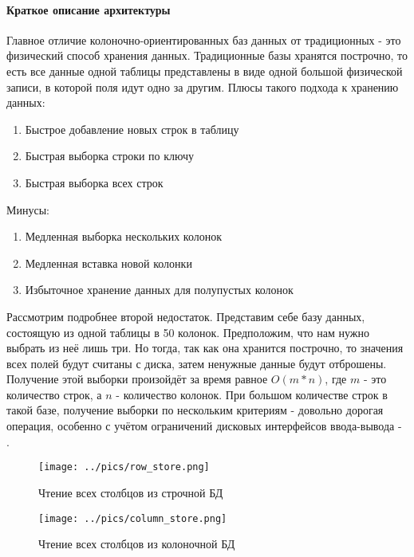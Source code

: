 \documentclass{matmex-diploma}
\begin{document}
        \paragraph{Краткое описание архитектуры}
            Главное отличие колоночно-ориентированных баз данных от традиционных - это физический способ хранения данных. Традиционные базы хранятся построчно, то есть все данные одной таблицы представлены в виде одной большой физической записи, в которой поля идут одно за другим.
        Плюсы такого подхода к хранению данных:
        \begin{enumerate}
            \item Быстрое добавление новых строк в таблицу
            \item Быстрая выборка строки по ключу
            \item Быстрая выборка всех строк
        \end{enumerate}
        Минусы:
        \begin{enumerate}
            \item Медленная выборка нескольких колонок
            \item Медленная вставка новой колонки
            \item Избыточное хранение данных для полупустых колонок
        \end{enumerate}
        Рассмотрим подробнее второй недостаток. Представим себе базу данных, состоящую из одной таблицы в 50 колонок. Предположим, что нам нужно выбрать из неё лишь три. Но тогда, так как она хранится построчно, то значения всех полей будут считаны с диска, затем ненужные данные будут отброшены. Получение этой выборки произойдёт за время равное $O(m * n)$, где $m$ - это количество строк, а $n$ - количество колонок. При большом количестве строк в такой базе, получение выборки по нескольким критериям - довольно дорогая операция, особенно с учётом ограничений дисковых интерфейсов ввода-вывода - \cite{habr:column_db}.
        
        \begin{figure}[h]
            \label{row_store}
            \centering
            \texttt{[image: ../pics/row\_store.png]}
            \caption{Чтение всех столбцов из строчной БД}
        \end{figure}
        
        \begin{figure}[h]
            \label{column_store}
            \centering
            \texttt{[image: ../pics/column\_store.png]}
            \caption{Чтение всех столбцов из колоночной БД}
        \end{figure}
        
\end{document}
